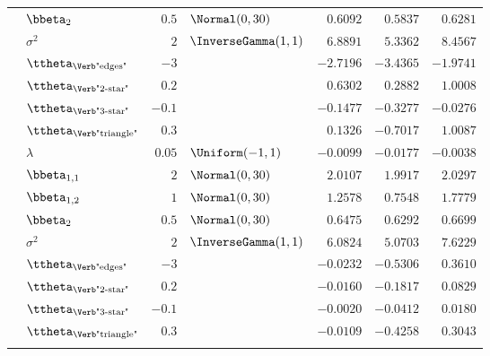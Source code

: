 \begin{table}[t]
\begin{tabular}{cl|rlrrr}
        & $\bbeta_{2}$                       & $0.5$  & $\Normal(0,30)$          & $0.6092$  & $0.5837$  & $0.6281$  \\
        & $\sigma^2$                         & $2$    & $\InverseGamma(1,1)$     & $6.8891$  & $5.3362$  & $8.4567$  \\
        & $\ttheta_{\text{\Verb"edges"}}$    & $-3$   &    & $-2.7196$ & $-3.4365$ & $-1.9741$ \\
        & $\ttheta_{\text{\Verb"2-star"}}$   & $0.2$  &   & $0.6302$  & $0.2882$  & $1.0008$  \\
        & $\ttheta_{\text{\Verb"3-star"}}$   & $-0.1$ &  & $-0.1477$ & $-0.3277$ & $-0.0276$ \\
        & $\ttheta_{\text{\Verb"triangle"}}$ & $0.3$  &   & $0.1326$  & $-0.7017$ & $1.0087$  \\
		\midrule
        & $\lambda$                          & $0.05$ & $\Uniform(-1,1)$         & $-0.0099$ & $-0.0177$ & $-0.0038$ \\
        & $\bbeta_{1,1}$                     & $2$    & $\Normal(0,30)$          & $2.0107$  & $1.9917$  & $2.0297$  \\
        & $\bbeta_{1,2}$                     & $1$    & $\Normal(0,30)$          & $1.2578$  & $0.7548$  & $1.7779$  \\
        & $\bbeta_{2}$                       & $0.5$  & $\Normal(0,30)$          & $0.6475$  & $0.6292$  & $0.6699$  \\
        & $\sigma^2$                         & $2$    & $\InverseGamma(1,1)$     & $6.0824$  & $5.0703$  & $7.6229$  \\
        & $\ttheta_{\text{\Verb"edges"}}$    & $-3$   &    & $-0.0232$ & $-0.5306$ & $0.3610$  \\
        & $\ttheta_{\text{\Verb"2-star"}}$   & $0.2$  &   & $-0.0160$ & $-0.1817$ & $0.0829$  \\
        & $\ttheta_{\text{\Verb"3-star"}}$   & $-0.1$ &  & $-0.0020$ & $-0.0412$ & $0.0180$  \\
        & $\ttheta_{\text{\Verb"triangle"}}$ & $0.3$  &   & $-0.0109$ & $-0.4258$ & $0.3043$  \\
		\midrule

\end{tabular}
\end{table}
